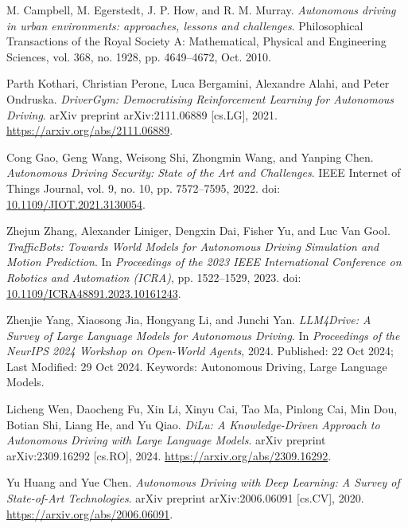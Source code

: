 \documentclass[lettersize,journal]{IEEEtran}
\begin{document}
\begin{thebibliography}{1}
M. Campbell, M. Egerstedt, J. P. How, and R. M. Murray.
\newblock \emph{Autonomous driving in urban environments: approaches, lessons and challenges}.
\newblock Philosophical Transactions of the Royal Society A: Mathematical, Physical and Engineering Sciences, vol. 368, no. 1928, pp. 4649–4672, Oct. 2010.


Parth Kothari, Christian Perone, Luca Bergamini, Alexandre Alahi, and Peter Ondruska.
\newblock \emph{DriverGym: Democratising Reinforcement Learning for Autonomous Driving}.
\newblock arXiv preprint arXiv:2111.06889 [cs.LG], 2021.
\newblock \url{https://arxiv.org/abs/2111.06889}.


Cong Gao, Geng Wang, Weisong Shi, Zhongmin Wang, and Yanping Chen.
\newblock \emph{Autonomous Driving Security: State of the Art and Challenges}.
\newblock IEEE Internet of Things Journal, vol. 9, no. 10, pp. 7572–7595, 2022.
\newblock doi: \url{10.1109/JIOT.2021.3130054}.


Zhejun Zhang, Alexander Liniger, Dengxin Dai, Fisher Yu, and Luc Van Gool.
\newblock \emph{TrafficBots: Towards World Models for Autonomous Driving Simulation and Motion Prediction}.
\newblock In \emph{Proceedings of the 2023 IEEE International Conference on Robotics and Automation (ICRA)}, pp. 1522–1529, 2023.
\newblock doi: \url{10.1109/ICRA48891.2023.10161243}.


Zhenjie Yang, Xiaosong Jia, Hongyang Li, and Junchi Yan.
\newblock \emph{LLM4Drive: A Survey of Large Language Models for Autonomous Driving}.
\newblock In \emph{Proceedings of the NeurIPS 2024 Workshop on Open-World Agents}, 2024.
\newblock Published: 22 Oct 2024; Last Modified: 29 Oct 2024.
\newblock Keywords: Autonomous Driving, Large Language Models.


Licheng Wen, Daocheng Fu, Xin Li, Xinyu Cai, Tao Ma, Pinlong Cai, Min Dou, Botian Shi, Liang He, and Yu Qiao.
\newblock \emph{DiLu: A Knowledge-Driven Approach to Autonomous Driving with Large Language Models}.
\newblock arXiv preprint arXiv:2309.16292 [cs.RO], 2024.
\newblock \url{https://arxiv.org/abs/2309.16292}.


Yu Huang and Yue Chen.
\newblock \emph{Autonomous Driving with Deep Learning: A Survey of State-of-Art Technologies}.
\newblock arXiv preprint arXiv:2006.06091 [cs.CV], 2020.
\newblock \url{https://arxiv.org/abs/2006.06091}.



\end{thebibliography}
\end{document}
